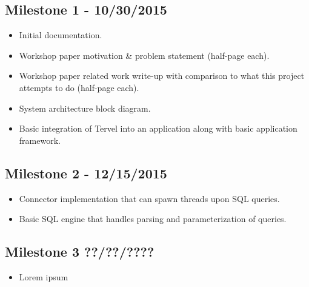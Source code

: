 \documentclass[letterpaper]{article}
\begin{document}
  \subsection{Milestone 1 - 10/30/2015}
  \begin{itemize}
   \item Initial documentation.
   \item Workshop paper motivation \& problem statement (half-page each).
   \item Workshop paper related work write-up with comparison to what this project attempts to do (half-page each).
   \item System architecture block diagram.
   \item Basic integration of Tervel into an application along with basic application framework.
  \end{itemize}
  \subsection{Milestone 2 - 12/15/2015}
  \begin{itemize}
   \item Connector implementation that can spawn threads upon SQL queries.
   \item Basic SQL engine that handles parsing and parameterization of queries.
  \end{itemize}
  \subsection{Milestone 3 ??/??/????}
  \begin{itemize}
   \item Lorem ipsum
  \end{itemize}
\end{document}
